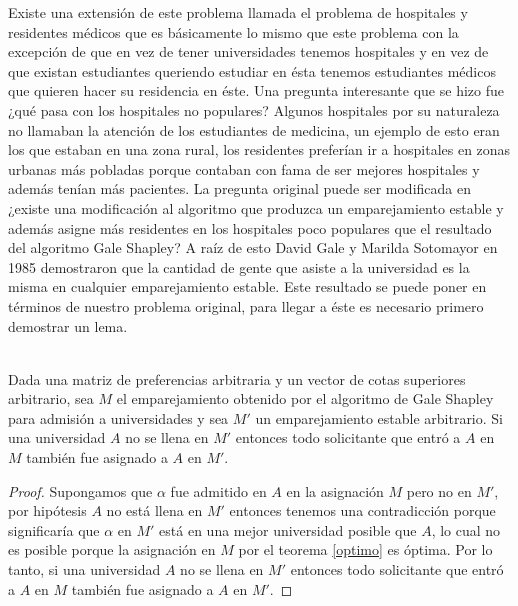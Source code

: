 Existe una extensión de este problema llamada el problema de hospitales y residentes médicos que es básicamente lo mismo que este problema con la excepción de que en vez de tener universidades tenemos hospitales y en vez de que existan estudiantes queriendo estudiar en ésta tenemos estudiantes médicos que quieren hacer su residencia en éste. Una pregunta interesante que se hizo fue ¿qué pasa con los hospitales no populares? Algunos hospitales por su naturaleza no llamaban la atención de los estudiantes de medicina, un ejemplo de esto eran los que estaban en una zona rural, los residentes preferían ir a hospitales en zonas urbanas más pobladas porque contaban con fama de ser mejores hospitales y además tenían más pacientes. La pregunta original puede ser modificada en ¿existe una modificación al algoritmo que produzca un emparejamiento estable y además asigne más residentes en los hospitales poco populares que el resultado del algoritmo Gale Shapley? A raíz de esto David Gale y Marilda Sotomayor en 1985 demostraron que la cantidad de gente que asiste a la universidad es la misma en cualquier emparejamiento estable. Este resultado se puede poner en términos de nuestro problema original, para llegar a éste es necesario primero demostrar un lema.

\begin{lem} 
\label{lema rural} 
\cite{Verde} \\
Dada una matriz de preferencias arbitraria y un vector de cotas superiores arbitrario, sea $M$ el emparejamiento obtenido por el algoritmo de Gale Shapley para admisión a universidades y sea $M'$ un emparejamiento estable arbitrario. Si una universidad $A$ no se llena en $M'$ entonces todo solicitante que entró a $A$ en $M$ también fue asignado a $A$ en $M'$. 
\end{lem}
\begin{proof}
Supongamos que $\alpha$ fue admitido en $A$ en la asignación $M$ pero no en $M'$, por hipótesis $A$ no está llena en $M'$ entonces tenemos una contradicción porque significaría que $\alpha$ en $M'$ está en una mejor universidad posible que $A$, lo cual no es posible porque la asignación en $M$ por el teorema \ref{optimo} es óptima. Por lo tanto, si una universidad $A$ no se llena en $M'$ entonces todo solicitante que entró a $A$ en $M$ también fue asignado a $A$ en $M'$. 
\end{proof}


